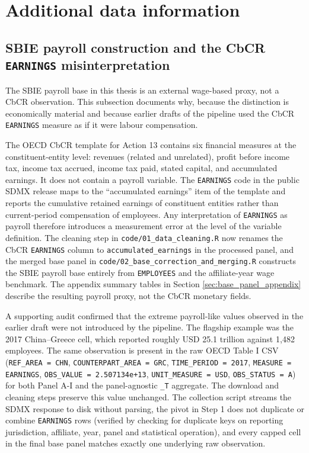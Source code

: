 \documentclass[11pt,a4paper]{article}
\newcommand{\workingnote}[1]{\ifworkingdoc{\textcolor{red}{\textit{[Working note: #1]}}}\fi}
\newcommand{\code}[1]{\texttt{#1}}
\begin{document}
\section{Additional data information}\label{sec:add_data}

\workingnote{AI generated based on datasets!!}




\subsection{SBIE payroll construction and the CbCR \code{EARNINGS} misinterpretation}\label{sec:earnings_audit}

The SBIE payroll base in this thesis is an external wage-based proxy, not a CbCR observation. This subsection documents why, because the distinction is economically material and because earlier drafts of the pipeline used the CbCR \code{EARNINGS} measure as if it were labour compensation.

The OECD CbCR template for Action 13 contains six financial measures at the constituent-entity level: revenues (related and unrelated), profit before income tax, income tax accrued, income tax paid, stated capital, and accumulated earnings. It does not contain a payroll variable. The \code{EARNINGS} code in the public SDMX release maps to the ``accumulated earnings'' item of the template and reports the cumulative retained earnings of constituent entities rather than current-period compensation of employees. Any interpretation of \code{EARNINGS} as payroll therefore introduces a measurement error at the level of the variable definition. The cleaning step in \texttt{code/01\_data\_cleaning.R} now renames the CbCR \code{EARNINGS} column to \code{accumulated\_earnings} in the processed panel, and the merged base panel in \texttt{code/02\_base\_correction\_and\_merging.R} constructs the SBIE payroll base entirely from \code{EMPLOYEES} and the affiliate-year wage benchmark. The appendix summary tables in Section \ref{sec:base_panel_appendix} describe the resulting payroll proxy, not the CbCR monetary fields.

A supporting audit confirmed that the extreme payroll-like values observed in the earlier draft were not introduced by the pipeline. The flagship example was the 2017 China--Greece cell, which reported roughly USD 25.1 trillion against 1{,}482 employees. The same observation is present in the raw OECD Table I CSV (\texttt{REF\_AREA = CHN}, \texttt{COUNTERPART\_AREA = GRC}, \texttt{TIME\_PERIOD = 2017}, \texttt{MEASURE = EARNINGS}, \texttt{OBS\_VALUE = 2.507134e+13}, \texttt{UNIT\_MEASURE = USD}, \texttt{OBS\_STATUS = A}) for both Panel A-I and the panel-agnostic \code{\_T} aggregate. The download and cleaning steps preserve this value unchanged. The collection script streams the SDMX response to disk without parsing, the pivot in Step 1 does not duplicate or combine \code{EARNINGS} rows (verified by checking for duplicate keys on reporting jurisdiction, affiliate, year, panel and statistical operation), and every capped cell in the final base panel matches exactly one underlying raw observation.
\end{document}
